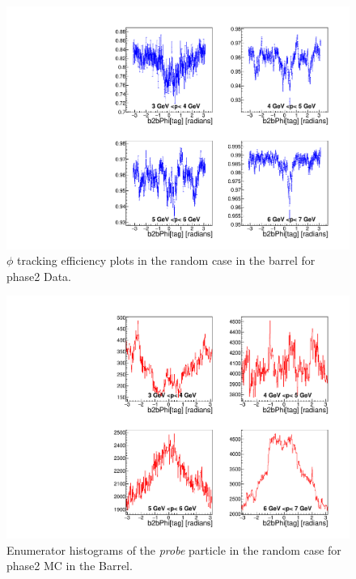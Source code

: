 \documentclass[a4paper,11pt,twosided,final,german,openbib,pdftex,listof=totoc,bibliography=totoc]{scrbook}
\begin{document}
\begin{appendix}
\begin{figure}[!htbp]
	\centering
	\includegraphics[width=\textwidth]{Plots/master/xPMPhiRandomBarrel_Data}
	\caption[Momentum $\phi$ Random Barrel Efficiency Phase2 Data]{$\phi$ tracking efficiency plots in the random case in the barrel for phase2 Data.}
	\label{plt:PMPhiRandomBarrel_Data}
\end{figure}


\begin{figure}[!htbp]
	\centering
	\includegraphics[width=\textwidth]{Plots/master/xPMPhiRandomBarrelE_MC}
	\caption[Momentum $\phi$ Random Barrel Enumerator Histogram Phase2 MC]{Enumerator histograms of the \textit{probe} particle in the random case for phase2 MC in the Barrel.}
	\label{plt:PMPhiRandomBarrelE_MC}
\end{figure}


\end{appendix}
\end{document}
